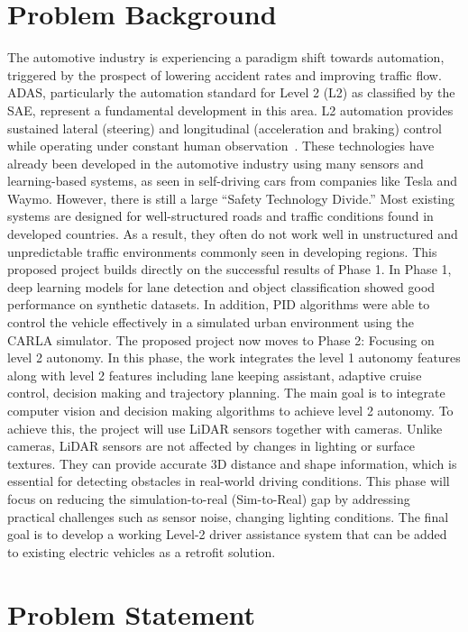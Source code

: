 \documentclass[12pt, a4paper]{report}
\begin{document}
\section{Problem Background}
The automotive industry is experiencing a paradigm shift towards automation, triggered by the prospect of lowering accident rates and improving traffic flow. \ac{ADAS}, particularly the automation standard for Level 2 (L2) as classified by the \ac{SAE}, represent a fundamental development in this area. L2 automation provides sustained lateral (steering) and longitudinal (acceleration and braking) control while operating under constant human observation~\cite{ref1}.
These technologies have already been developed in the automotive industry using many sensors and learning-based systems, as seen in self-driving cars from companies like Tesla and Waymo. However, there is still a large “Safety Technology Divide.” Most existing systems are designed for well-structured roads and traffic conditions found in developed countries. As a result, they often do not work well in unstructured and unpredictable traffic environments commonly seen in developing regions. This proposed project builds directly on the successful results of Phase 1. In Phase 1, deep learning models for lane detection and object classification showed good performance on synthetic datasets. In addition, \ac{PID} algorithms were able to control the vehicle effectively in a simulated urban environment using the CARLA simulator.
The proposed project now moves to Phase 2: Focusing on level 2 autonomy. In this phase, the work integrates the level 1 autonomy features along with level 2 features including lane keeping assistant, adaptive cruise control, decision making and trajectory planning. The main goal is to integrate computer vision and decision making algorithms to achieve level 2 autonomy. To achieve this, the project will use LiDAR sensors together with cameras. Unlike cameras, LiDAR sensors are not affected by changes in lighting or surface textures. They can provide accurate 3D distance and shape information, which is essential for detecting obstacles in real-world driving conditions. This phase will focus on reducing the simulation-to-real (Sim-to-Real) gap by addressing practical challenges such as sensor noise, changing lighting conditions. The final goal is to develop a working Level-2 driver assistance system that can be added to existing electric vehicles as a retrofit solution.

\section{Problem Statement}
\end{document}
